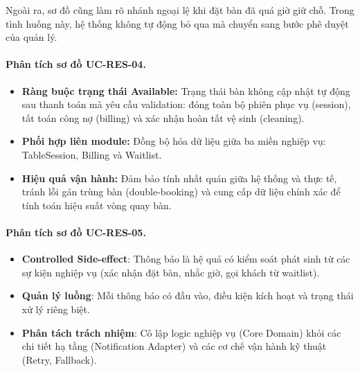 Ngoài ra, sơ đồ cũng làm rõ nhánh ngoại lệ khi đặt bàn đã quá giờ giữ chỗ. Trong tình huống này, hệ thống không tự động bỏ qua mà chuyển sang bước phê duyệt của quản lý. 


\paragraph{Phân tích sơ đồ UC-RES-04.}
\begin{itemize}
\item \textbf{Ràng buộc trạng thái \textsf{Available}:} Trạng thái bàn không cập nhật tự động sau thanh toán mà yêu cầu validation: đóng toàn bộ phiên phục vụ (\textsf{session}), tất toán công nợ (\textsf{billing}) và xác nhận hoàn tất vệ sinh (\textsf{cleaning}).
\item \textbf{Phối hợp liên module:} Đồng bộ hóa dữ liệu giữa ba miền nghiệp vụ: \textsf{TableSession}, \textsf{Billing} và \textsf{Waitlist}.
\item \textbf{Hiệu quả vận hành:} Đảm bảo tính nhất quán giữa hệ thống và thực tế, tránh lỗi gán trùng bàn (double-booking) và cung cấp dữ liệu chính xác để tính toán hiệu suất vòng quay bàn.
\end{itemize}

\paragraph{Phân tích sơ đồ UC-RES-05.}
\begin{itemize}
\item \textbf{Controlled Side-effect}: Thông báo là hệ quả có kiểm soát phát sinh từ các sự kiện nghiệp vụ (xác nhận đặt bàn, nhắc giờ, gọi khách từ waitlist).
\item \textbf{Quản lý luồng}: Mỗi thông báo có đầu vào, điều kiện kích hoạt và trạng thái xử lý riêng biệt.
\item \textbf{Phân tách trách nhiệm}: Cô lập logic nghiệp vụ (\textsf{Core Domain}) khỏi các chi tiết hạ tầng (\textsf{Notification Adapter}) và các cơ chế vận hành kỹ thuật (\textsf{Retry}, \textsf{Fallback}).
\end{itemize}

